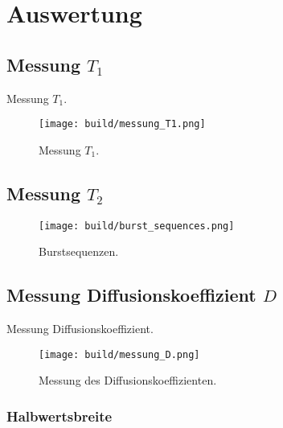 \section{Auswertung}%
\label{sec:auswertung}

\subsection{Messung $T_1$}%
\label{sub:messung_t_1_}

\begin{table}[ht]
  \centering
  \caption{Messung $T_1$.}%
  \label{tab:t1}
  
\end{table}

\begin{figure}[ht]
  \centering
  \texttt{[image: build/messung\_T1.png]}
  \caption{Messung $T_1$.}%
  \label{fig:messung_T1}
\end{figure}

\subsection{Messung $T_2$}%
\label{sub:messung_t_2_}

\begin{figure}[ht]
  \centering
  \texttt{[image: build/burst\_sequences.png]}
  \caption{Burstsequenzen.}%
  \label{fig:burst_sequences}
\end{figure}

\subsection{Messung Diffusionskoeffizient $D$}%
\label{sub:messung_diffusionskoeffizient_d_}

\begin{table}[ht]
  \centering
  \caption{Messung Diffusionskoeffizient.}%
  
\end{table}

\begin{figure}[ht]
  \centering
  \texttt{[image: build/messung\_D.png]}
  \caption{Messung des Diffusionskoeffizienten.}%
  \label{fig:messung_D}
\end{figure}

\subsubsection{Halbwertsbreite}%
\label{sub:halbwertsbreite}

